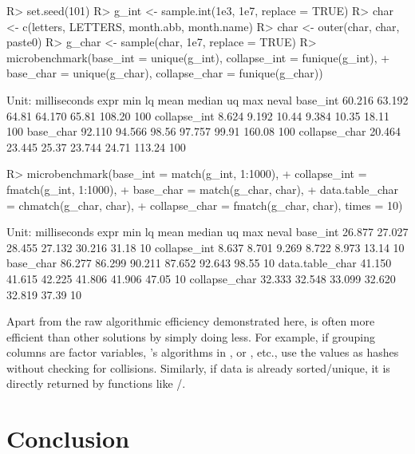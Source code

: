 \documentclass[article]{jss}
\begin{document}
\begin{Schunk}
\begin{Sinput}
R> set.seed(101)
R> g_int <- sample.int(1e3, 1e7, replace = TRUE)
R> char <- c(letters, LETTERS, month.abb, month.name)
R> char <- outer(char, char, paste0)
R> g_char <- sample(char, 1e7, replace = TRUE)
R> microbenchmark(base_int = unique(g_int), collapse_int = funique(g_int),
+              base_char = unique(g_char), collapse_char = funique(g_char))
\end{Sinput}
\begin{Soutput}
Unit: milliseconds
          expr    min     lq  mean median    uq    max neval
      base_int 60.216 63.192 64.81 64.170 65.81 108.20   100
  collapse_int  8.624  9.192 10.44  9.384 10.35  18.11   100
     base_char 92.110 94.566 98.56 97.757 99.91 160.08   100
 collapse_char 20.464 23.445 25.37 23.744 24.71 113.24   100
\end{Soutput}
\begin{Sinput}
R> microbenchmark(base_int = match(g_int, 1:1000),
+                 collapse_int = fmatch(g_int, 1:1000),
+                 base_char = match(g_char, char),
+                 data.table_char = chmatch(g_char, char),
+                 collapse_char = fmatch(g_char, char), times = 10)
\end{Sinput}
\begin{Soutput}
Unit: milliseconds
            expr    min     lq   mean median     uq   max neval
        base_int 26.877 27.027 28.455 27.132 30.216 31.18    10
    collapse_int  8.637  8.701  9.269  8.722  8.973 13.14    10
       base_char 86.277 86.299 90.211 87.652 92.643 98.55    10
 data.table_char 41.150 41.615 42.225 41.806 41.906 47.05    10
   collapse_char 32.333 32.548 33.099 32.620 32.819 37.39    10
\end{Soutput}
\end{Schunk}
%
Apart from the raw algorithmic efficiency demonstrated here,  is often more efficient than other solutions by simply doing less. For example, if grouping columns are factor variables, 's algorithms in ,  or , etc., use the values as hashes without checking for collisions. Similarly, if data is already sorted/unique, it is directly returned by functions like /.

\newpage

\section{Conclusion} \label{sec:conclusion}
\end{document}
